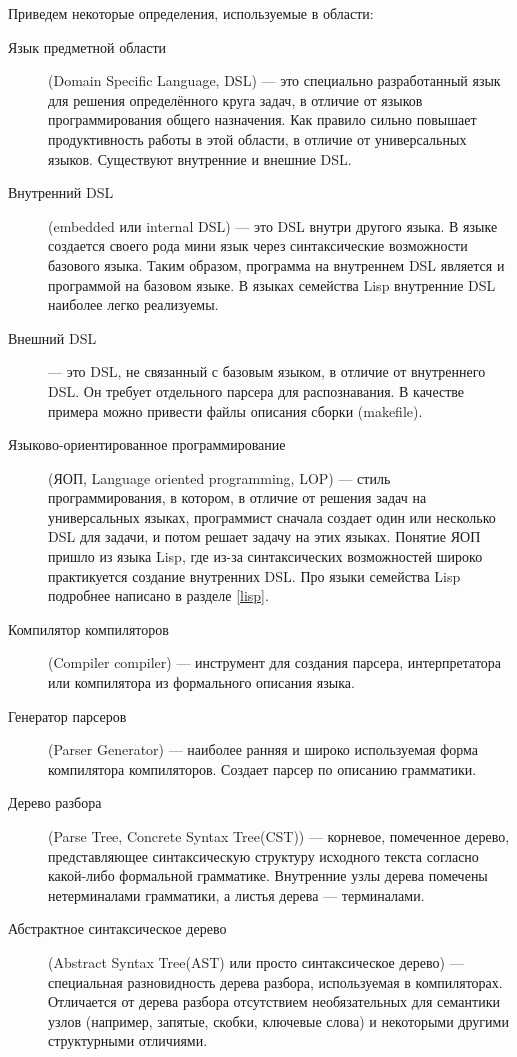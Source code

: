 \documentclass[a4paper,12pt,titlepage]{extarticle}
\begin{document}
Приведем некоторые определения, используемые в области:
\begin{description}
  \item[Язык предметной области] (Domain Specific Language, DSL) --- это
  специально разработанный язык для решения определённого круга задач, в
  отличие от языков программирования общего назначения. Как правило
  сильно повышает продуктивность работы в этой области, в отличие от
  универсальных языков. Существуют внутренние и внешние DSL.
  \item[Внутренний DSL] (embedded или internal DSL) --- это DSL внутри другого
  языка. В языке создается своего рода мини язык через синтаксические
  возможности базового языка. Таким образом, программа на внутреннем DSL
  является и программой на базовом языке. В языках семейства Lisp внутренние
  DSL наиболее легко реализуемы.
  \item[Внешний DSL] --- это DSL, не связанный с базовым языком, в отличие от
  внутреннего DSL. Он требует отдельного парсера для распознавания. В качестве
  примера можно привести файлы описания сборки (makefile).
  \item[Языково-ориентированное программирование] (ЯОП, Language oriented
  programming, LOP) --- стиль программирования, в котором, в отличие от решения
  задач на универсальных языках, программист сначала создает один или несколько
  DSL для задачи, и потом решает задачу на этих языках. Понятие ЯОП пришло из
  языка Lisp, где из-за синтаксических возможностей широко практикуется
  создание внутренних DSL. Про языки семейства Lisp подробнее написано в
  разделе \ref{lisp}.
  \item[Компилятор компиляторов] (Compiler compiler) ---
  инструмент для создания парсера, интерпретатора или компилятора из формального
  описания языка.
  \item[Генератор парсеров] (Parser Generator) ---
  наиболее ранняя и широко используемая форма компилятора компиляторов.
  Создает парсер по описанию грамматики.
  \item[Дерево разбора] (Parse Tree, Concrete Syntax Tree(CST)) ---
  корневое, помеченное дерево, представляющее синтаксическую структуру
  исходного текста согласно какой-либо формальной грамматике. Внутренние узлы
  дерева помечены нетерминалами грамматики, а листья дерева --- терминалами.
  \item[Абстрактное синтаксическое дерево] (Abstract Syntax Tree(AST) или
  просто синтаксическое дерево) --- специальная разновидность дерева разбора,
  используемая в компиляторах. Отличается от дерева разбора отсутствием
  необязательных для семантики узлов (например, запятые, скобки, ключевые слова)
  и некоторыми другими структурными отличиями.
\end{description}
\end{document}
